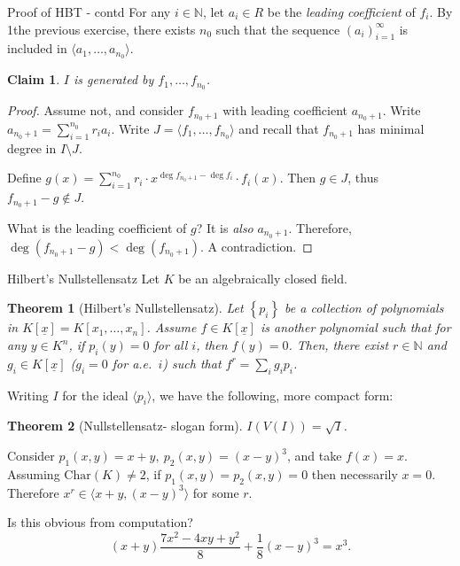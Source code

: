 \documentclass[12pt, draft,reqno,a4paper, twoside]{beamer}
\theoremstyle{plain}
\newtheorem{theo}{Theorem}
\newtheorem{claim}{Claim}
\theoremstyle{definition}
\newcommand{\dbN}{\mathbb N}
\newcommand{\bmx}{\underline{x}}
\newcommand{\gen}[1]{\langle{#1}\rangle}
\newcommand{\set}[1]{\left\{{#1}\right\}}
\begin{document}
\begin{frame}{Proof of HBT - contd}
	For any $i\in\dbN$, let $a_i\in R$ be the \textit{leading coefficient} of $f_i$. \onslide<2-> By 1the previous exercise, there exists $n_0$ such that the sequence $(a_i)_{i=1}^\infty$ is included in $\gen{a_1,\ldots,a_{n_0}}$. 
	
	\begin{claim}
		$I$ is generated by $f_1,\ldots, f_{n_0}$. 
	\end{claim}
	\begin{proof}
		Assume not, and consider $f_{n_0+1}$ with leading coefficient $a_{n_0+1}$. Write $a_{n_0+1}=\sum_{i=1}^{n_0}r_i a_i$. \onslide<6-> Write $J=\gen{f_1,\ldots,f_{n_0}}$ and recall that $f_{n_0+1}$ has minimal degree in $I\setminus J$. 
		
		 Define $g(x)=\sum_{i=1}^{n_0}r_i \cdot x^{\deg f_{n_0+1}-\deg f_i}\cdot f_i(x)$. Then $g\in J$, thus $f_{n_0+1}-g\notin J$.
		
		What is the leading coefficient of $g$? \onslide<9->It is \textit{also} $a_{n_0+1}$. Therefore, $\deg(f_{n_0+1}-g)<\deg(f_{n_0+1})$. A contradiction.
	\end{proof}
\end{frame}

\begin{frame}{Hilbert's Nullstellensatz}
Let $K$ be an algebraically closed field.
\begin{theo}[Hilbert's Nullstellensatz]
	Let $\set{p_i}$ be a collection of polynomials in $K[\bmx]=K[x_1,\ldots,x_n]$. Assume $f\in K[\bmx]$ is another polynomial such that for any $y\in K^n$, if $p_i(y)=0$ for all $i$, then $f(y)=0$. \onslide<3-> Then, there exist $r\in\dbN$ and $g_i\in K[\bmx]$ ($g_i=0$ for a.e.~$i$) such that $f^r=\sum_i g_ip_i$.
\end{theo}

 Writing $I$ for the ideal $\gen{p_i}$, we have the following, more compact form:
\begin{theo}[Nullstellensatz- slogan form]
	$I(V(I))=\sqrt{I}$. 
\end{theo}
\end{frame}

\begin{frame}
\begin{example}
	Consider $p_1(x,y)=x+y,\:p_2(x,y)=(x-y)^3$, and take $f(x)=x$. Assuming $\mathrm{Char}(K)\ne 2$, if $p_1(x,y)=p_2(x,y)=0$ then necessarily $x=0$. Therefore $x^r\in \gen{x+y,(x-y)^3}$ for some $r$.
	\bigskip
	
	 Is this obvious from computation?
	\onslide<3->
	\[(x+y)\frac{7x^2-4xy+y^2}{8}+\frac{1}{8}(x-y)^3=x^3.\]
\end{example}
\end{frame}
\end{document}
